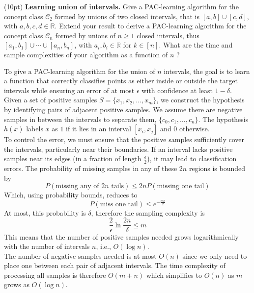 \documentclass[11pt]{article}
\DeclareMathOperator{\1}{\mathbbm{1}}
\begin{document}
\begin{problem}(10pt) \textbf{Learning union of intervals.} Give a PAC-learning algorithm for the concept class $\mathcal{C}_{2}$ formed by unions of two closed intervals, that is $[a, b] \cup[c, d]$, with $a, b, c, d \in \mathbb{R}$. Extend your result to derive a PAC-learning algorithm for the concept class $\mathcal{C}_{n}$ formed by unions of $n \geq 1$ closed intervals, thus $\left[a_{1}, b_{1}\right] \cup \cdots \cup\left[a_{n}, b_{n}\right]$, with $a_{i}, b_{i} \in \mathbb{R}$ for $k \in[n]$. What are the time and sample complexities of your algorithm as a function of $n$ ?
\end{problem}
To give a PAC-learning algorithm for the union of $n$ intervals, the goal is to learn a function that correctly classifies points as either inside or outside the target intervals while ensuring an error of at most $\epsilon$ with confidence at least $1-\delta$. \\
Given a set of positive samples $S=\{ x_1, x_2, \ldots, x_m \}$, we construct the hypothesis by identifying pairs of adjacent positive samples. We assume there are negative samples in between the intervals to separate them, $\{ c_0, c_1, \ldots, c_n \}$. The hypothesis $h(x)$ labels $x$ as $1$ if it lies in an interval $[x_i, x_j]$ and $0$ otherwise. \\
To control the error, we must ensure that the positive samples sufficiently cover the intervals, particularly near their boundaries. If an interval lacks positive samples near its edges (in a fraction of length $\frac{\epsilon}{2}$), it may lead to classification errors. The probability of missing samples in any of these $2n$ regions is bounded by $$P(\text{missing any of }2n \text{ tails}) \leq 2nP(\text{missing one tail}) $$ Which, using probability bounds, reduces to $$P(\text{miss one tail}) \leq e^{-\frac{m\epsilon}{2}}$$ At most, this probability is $\delta$, therefore the sampling complexity is $$\frac{2}{\epsilon}\ln \frac{2n}{\delta} \leq m$$ This means that the number of positive samples needed grows logarithmically with the number of intervals $n$, i.e., $O(\log n)$. \\
The number of negative samples needed is at most $O(n)$ since we only need to place one between each pair of adjacent intervals. The time complexity of processing all samples is therefore $O(m + n)$ which simplifies to $O(n)$ as $m$ grows as $O(\log n)$.
\end{document}
